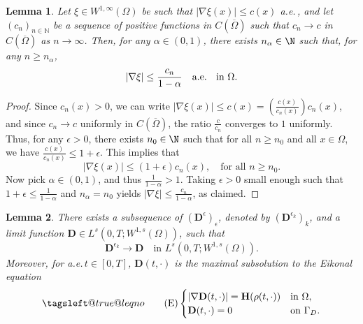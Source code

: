 \documentclass[final,reqno]{amsart}
\makeatletter
\theoremstyle{plain}
\newtheorem{lemma}{Lemma}	%
\theoremstyle{definition}
\theoremstyle{remark}
\numberwithin{remark}{section}	%
\numberwithin{example}{section}	%
\newcommand{\de}{\mathbf{D}}
\newcommand{\he}{\mathbf{H}}
\newcommand{\pp}{a.e.\,}
\newcommand{\leqnomode}{\tagsleft@true\let\veqno\@@leqno}
\makeatother
\begin{document}
\begin{lemma}\label{lem:l5}
    Let $\xi \in W^{1,\infty}(\Omega)$ be such that $\vert\nabla \xi(x)\vert \le c(x)$ \pp, and let $(c_n)_{n \in \mathbb{N}}$ be a sequence of positive functions in $C(\overline{\Omega})$ such that $c_n \to c$ in $C(\overline{\Omega})$ as $n \to \infty$. Then, for any $\alpha \in (0,1)$, there exists $n_\alpha\in\N$ such that, for any $n \ge n_\alpha$, 
    \[
        \vert\nabla \xi\vert\le \frac{c_n}{1-\alpha} \quad \text{\pp~ in } \Omega.
    \]
\end{lemma}

\begin{proof}
    Since $c_n(x) > 0$, we can write $\vert\nabla \xi(x)\vert \le c(x) = \left(\frac{c(x)}{c_n(x)}\right) c_n(x)$, and since $c_n \to c$ uniformly in $C(\overline{\Omega})$, the ratio $\frac{c}{c_n}$ converges to $1$ uniformly. Thus, for any $\epsilon > 0$, there exists $n_0 \in \N$ such that for all $n \geq n_0$ and all $x \in \Omega$, we have $\frac{c(x)}{c_n(x)} \le 1+\epsilon$.
    This implies that 
    \[
        \vert\nabla \xi(x)\vert \leq (1+\epsilon) c_n(x), \quad \text{for all } n \ge n_0.
    \]
    Now pick $\alpha \in (0,1)$, and thus $\frac{1}{1-\alpha} > 1$. Taking $\epsilon > 0$ small enough such that $1+\epsilon \le \frac{1}{1-\alpha}$ and $n_\alpha = n_0$ yields $\vert\nabla \xi\vert \le \frac{c_n}{1-\alpha}$, as claimed.
\end{proof}
\begin{lemma}\label{lem:Deps}
    There exists a subsequence of $(\de^\epsilon)_{\epsilon}$, denoted by $(\de^{\epsilon_k})_{k}$, and a limit function $\de \in L^s(0,T; W^{1,s}(\Omega))$, such that 	
    \begin{equation*}
        \de^{\epsilon_k} \to \de \quad \text{in } L^s(0,T; W^{1,s}(\Omega)).
    \end{equation*}
    Moreover, for \pp $t \in [0,T]$, $\de(t, \cdot)$ is the maximal subsolution to the Eikonal equation
    \begin{equation}\leqnomode
        \tag{$\textup{E}$}
        \label{eq:eikonal-H}
        \begin{cases}
            \vert \nabla \de(t, \cdot) \vert = \he(\rho(t, \cdot)) & \text{in } \Omega, \\
            \de(t, \cdot) = 0 & \text{on } \Gamma_D.
        \end{cases}
    \end{equation}
\end{lemma}
\end{document}

